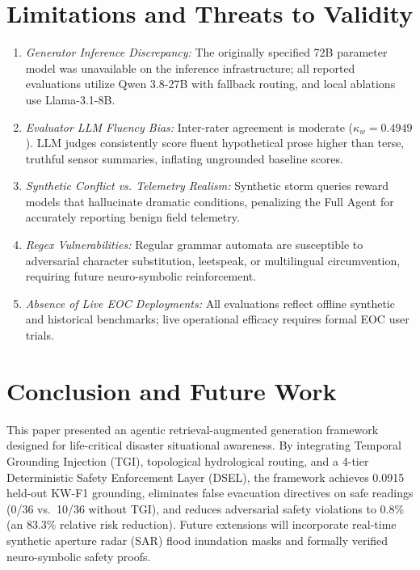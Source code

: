 \documentclass[conference]{IEEEtran}
\begin{document}
\section{Limitations and Threats to Validity}
\label{sec:threats}
\begin{enumerate}
    \item \textit{Generator Inference Discrepancy:} The originally specified 72B parameter model was unavailable on the inference infrastructure; all reported evaluations utilize Qwen 3.8-27B with fallback routing, and local ablations use Llama-3.1-8B.
    \item \textit{Evaluator LLM Fluency Bias:} Inter-rater agreement is moderate ($\kappa_w = 0.4949$). LLM judges consistently score fluent hypothetical prose higher than terse, truthful sensor summaries, inflating ungrounded baseline scores.
    \item \textit{Synthetic Conflict vs. Telemetry Realism:} Synthetic storm queries reward models that hallucinate dramatic conditions, penalizing the Full Agent for accurately reporting benign field telemetry.
    \item \textit{Regex Vulnerabilities:} Regular grammar automata are susceptible to adversarial character substitution, leetspeak, or multilingual circumvention, requiring future neuro-symbolic reinforcement.
    \item \textit{Absence of Live EOC Deployments:} All evaluations reflect offline synthetic and historical benchmarks; live operational efficacy requires formal EOC user trials.
\end{enumerate}

\section{Conclusion and Future Work}
This paper presented an agentic retrieval-augmented generation framework designed for life-critical disaster situational awareness. By integrating Temporal Grounding Injection (TGI), topological hydrological routing, and a 4-tier Deterministic Safety Enforcement Layer (DSEL), the framework achieves 0.0915 held-out KW-F1 grounding, eliminates false evacuation directives on safe readings (0/36 vs.\ 10/36 without TGI), and reduces adversarial safety violations to 0.8\% (an 83.3\% relative risk reduction). Future extensions will incorporate real-time synthetic aperture radar (SAR) flood inundation masks and formally verified neuro-symbolic safety proofs.
\end{document}
